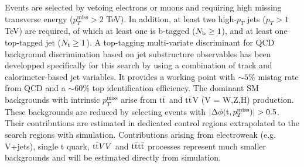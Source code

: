 \documentclass[11pt,twoside,a4paper]{cernrep}
\begin{document}
Events are selected by vetoing electrons or muons and requiring high missing transverse energy ($p_T^{\mathrm{miss}}>2$ TeV). In addition, at least two high-$p_T$ jets ($p_T > 1$ TeV) are required, of which at least one is b-tagged ($N_{\rm b} \geq 1$), and at least one top-tagged jet ($N_{\rm t} \geq 1$). A top-tagging multi-variate discriminant for QCD background discrimination based on jet substructure observables has been developped specifically for this search by using a combination of track and calorimeter-based jet variables. It provides a working point with $\sim5\%$ mistag rate from QCD and a $\sim60\%$ top identification efficiency. The dominant SM backgrounds with intrinsic $p_T^{\mathrm{miss}}$ arise from $\rm t \bar{t}$ and $\rm t \bar{t}$V (V {=} W,Z,H) production. These backgrounds are reduced by selecting events with $|\Delta \phi({\rm t},p_T^{\mathrm{miss}})| > 0.5$.  Their contributions are estimated in dedicated control regions extrapolated to the search regions with simulation. Contributions arising from electroweak (e.g. V+jets), single t quark, ${\rm t \bar{t}} VV$ and $\rm t \bar{t} t \bar{t}$ processes represent much smaller backgrounds and will be estimated directly from simulation.
\end{document}
